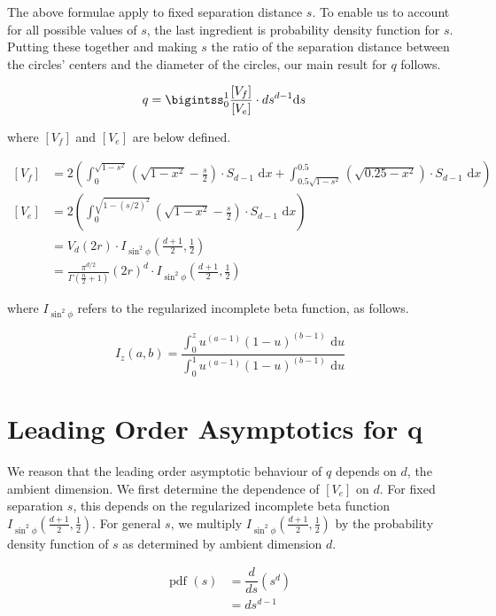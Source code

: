 \documentclass[11pt]{article}
\theoremstyle{definition}
\begin{document}
The above formulae apply to fixed separation distance $s$. To enable us to account for all possible values of $s$, the last ingredient is probability density function for $s$. Putting these together and making $s$ the ratio of the separation distance between the circles' centers and the diameter of the circles, our main result for $q$ follows.

$$
\begin{aligned}
q &= \bigintss_0^{1} \frac{[V_f]}{[V_e]} \cdot ds^{d-1} \text{d}s
\end{aligned}
$$

where $[V_f]$ and $[V_e]$ are below defined.

$$
\begin{aligned}
[V_f]&= 2\left( \int_0^{\sqrt{1-s^2}} (\sqrt{1-x^2}- \frac{s}{2}) \cdot S_{d-1} \text{ d}x + \int_{0.5\sqrt{1-s^2}}^{0.5} (\sqrt{0.25-x^2}) \cdot S_{d-1} \text{ d}x \right) \\
[V_e] &= 2 \left(\int_0^{\sqrt{1-(s/2)^2}} (\sqrt{1-x^2}-\frac{s}{2}) \cdot S_{d-1} \text{ d}x \right) \\
&= V_d(2r) \cdot I_{\sin^2\phi}\left(\frac{d+1}{2}, \frac{1}{2}\right) \\
&= \frac{\pi^{d/2}}{\Gamma(\frac{n}{2}+1)}(2r)^d \cdot I_{\sin^2\phi}\left(\frac{d+1}{2}, \frac{1}{2}\right)
\end{aligned}
$$

where $I_{\sin^2\phi}$ refers to the regularized incomplete beta function, as follows.

$$
I_z(a,b) = \frac{\int_0^z u^{(a-1)}(1-u)^{(b-1)}  \text{ d}u}{\int_0^1 u^{(a-1)}(1-u)^{(b-1)} \text{ d}u}
$$

\newpage
\section{Leading Order Asymptotics for q}

We reason that the leading order asymptotic behaviour of $q$ depends on $d$, the ambient dimension. We first determine the dependence of $[V_e]$ on $d$. For fixed separation $s$, this depends on the regularized incomplete beta function $I_{\sin^2\phi}\left(\frac{d+1}{2}, \frac{1}{2}\right)$. For general $s$, we multiply $I_{\sin^2\phi}\left(\frac{d+1}{2}, \frac{1}{2}\right)$ by the probability density function of $s$ as determined by ambient dimension $d$.

$$
\begin{aligned}
\text{pdf }(s) &= \dfrac{d}{ds} \left(s^d\right) \\
&= ds^{d-1}
\end{aligned}
$$
\end{document}
